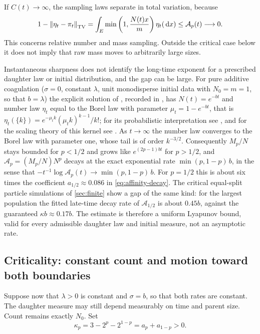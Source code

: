 \begin{remark}\label{rem:relative}
If $C(t)\to\infty$, the sampling laws separate in total variation, because
\begin{equation}
 1-\left\lVert \eta_t-\pi_t\right\rVert_{\mathrm{TV}}
 =\int_E\min\left(1,\frac{N(t)x}{m}\right)\eta_t(\,\mathrm d x)
 \leq\mathcal A_p(t)\longrightarrow0.
 \label{eq:overlap-affinity}
\end{equation}
This concerns relative number and mass sampling. Outside the critical
case below it does not imply that raw mass moves to arbitrarily large
sizes.

Instantaneous sharpness does not identify the long-time exponent for a
prescribed daughter law or initial distribution, and the gap can be
large. For pure additive coagulation ($\sigma=0$, constant $\lambda$,
unit monodisperse initial data with $N_0=m=1$, so that $b=\lambda$) the
explicit solution of \citet{Golovin1963}, recorded in \citet{Bertoin2009},
has $N(t)=e^{-bt}$ and number law $\eta_t$ equal to the Borel law with
parameter $\mu_t=1-e^{-bt}$, that is
$\eta_t(\{k\})=e^{-\mu_tk}(\mu_tk)^{k-1}/k!$; for its probabilistic
interpretation see \citet{DeaconuTanre2000,Bertoin2002}, and for the
scaling theory of this kernel see \citet{MenonPego2008}. As $t\to\infty$
the number law converges to the Borel law with parameter one, whose tail
is of order $k^{-3/2}$. Consequently $M_p/N$ stays bounded for $p<1/2$ and
grows like $e^{(2p-1)bt}$ for $p>1/2$, and $\mathcal A_p=(M_p/N)N^p$
decays at the exact exponential rate $\min(p,1-p)\,b$, in the sense that
$-t^{-1}\log\mathcal A_p(t)\to\min(p,1-p)\,b$. For $p=1/2$ this is about
six times the coefficient $a_{1/2}\approx0.086$ in
\eqref{eq:affinity-decay}. The critical equal-split particle simulations
of \cref{sec:finite} show a gap of the same kind: for the largest
population the fitted late-time decay rate of $\mathcal A_{1/2}$ is about
$0.45b$, against the guaranteed $\kappa b\approx0.17b$. The estimate is
therefore a uniform Lyapunov bound, valid for every admissible daughter
law and initial measure, not an asymptotic rate.
\end{remark}

\subsection{Criticality: constant count and motion toward both boundaries}

Suppose now that $\lambda>0$ is constant and $\sigma=b$, so that both
rates are constant.
The daughter measure may still depend measurably on time and parent size.
Count remains exactly $N_0$. Set
\begin{equation}
 \kappa_p=3-2^p-2^{1-p}=a_p+a_{1-p}>0.
 \label{eq:kappap}
\end{equation}

